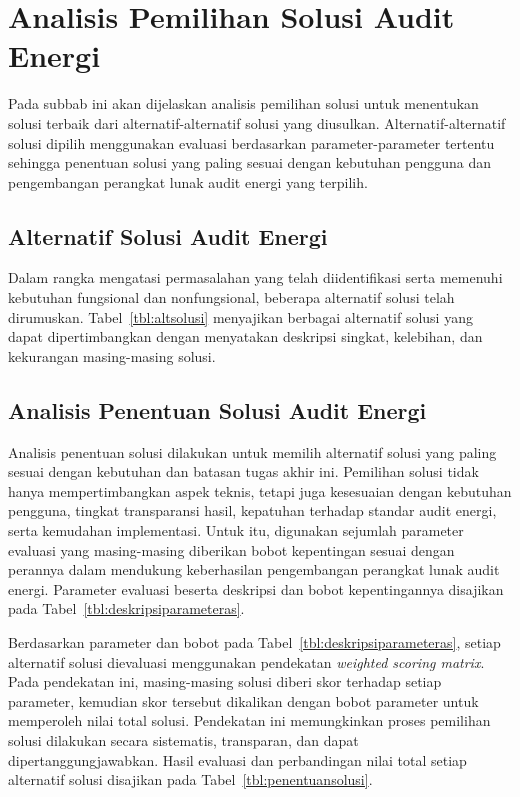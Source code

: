 \section{Analisis Pemilihan Solusi Audit Energi}
Pada subbab ini akan dijelaskan analisis pemilihan solusi untuk menentukan solusi terbaik dari alternatif-alternatif solusi yang diusulkan. Alternatif-alternatif solusi dipilih menggunakan evaluasi berdasarkan parameter-parameter tertentu sehingga penentuan solusi yang paling sesuai dengan kebutuhan pengguna dan pengembangan perangkat lunak audit energi yang terpilih.

\subsection{Alternatif Solusi Audit Energi}
Dalam rangka mengatasi permasalahan yang telah diidentifikasi serta memenuhi kebutuhan fungsional dan nonfungsional, beberapa alternatif solusi telah dirumuskan. Tabel~\ref{tbl:altsolusi} menyajikan berbagai alternatif solusi yang dapat dipertimbangkan dengan menyatakan deskripsi singkat, kelebihan, dan kekurangan masing-masing solusi.



\subsection{Analisis Penentuan Solusi Audit Energi}
Analisis penentuan solusi dilakukan untuk memilih alternatif solusi yang paling sesuai dengan kebutuhan dan batasan tugas akhir ini. Pemilihan solusi tidak hanya mempertimbangkan aspek teknis, tetapi juga kesesuaian dengan kebutuhan pengguna, tingkat transparansi hasil, kepatuhan terhadap standar audit energi, serta kemudahan implementasi. Untuk itu, digunakan sejumlah parameter evaluasi yang masing-masing diberikan bobot kepentingan sesuai dengan perannya dalam mendukung keberhasilan pengembangan perangkat lunak audit energi. Parameter evaluasi beserta deskripsi dan bobot kepentingannya disajikan pada Tabel~\ref{tbl:deskripsiparameteras}.



Berdasarkan parameter dan bobot pada Tabel~\ref{tbl:deskripsiparameteras}, setiap alternatif solusi dievaluasi menggunakan pendekatan \textit{weighted scoring matrix}. Pada pendekatan ini, masing-masing solusi diberi skor terhadap setiap parameter, kemudian skor tersebut dikalikan dengan bobot parameter untuk memperoleh nilai total solusi. Pendekatan ini memungkinkan proses pemilihan solusi dilakukan secara sistematis, transparan, dan dapat dipertanggungjawabkan. Hasil evaluasi dan perbandingan nilai total setiap alternatif solusi disajikan pada Tabel~\ref{tbl:penentuansolusi}.

